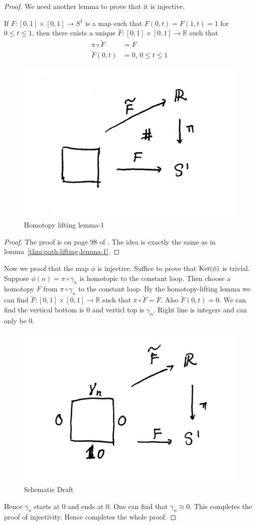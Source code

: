 \begin{proof}
    We need another lemma to prove that it is injective.
    \begin{lemma}
        If $F:[0,1]\times[0,1]\to S^1$ is a map such that
        $F(0,t)=F(1,t)=1$ for $0\leq t\leq 1$, then there exists a
        unique $\widetilde F: [0,1]\times[0,1]\to \mathbb{R}$ such that
        \begin{align}
            \pi\circ \widetilde F &= F \\
            \widetilde F(0,t) &=0,\, 0\leq t\leq 1
        \end{align}
    \end{lemma}
    \begin{figure}[H]
        \centering
        \includegraphics[width=0.5\linewidth]{pics/homotopy-lifting-1.pdf}
        \caption{Homotopy lifting lemma-1}
    \end{figure}
    \begin{proof}
        The proof is on page 98 of \cite{book}. The idea is exactly
        the same as in lemma~\ref{thm:path-lifting-lemma-1}.
    \end{proof}
    Now we proof that the map $\phi$ is injective. Suffice to prove
    that $\operatorname{Ker}(\phi)$ is trivial. Suppose $\phi(n)=\pi\circ \gamma_n$
    is homotopic to the constant loop. Then choose a homotopy $F$
    from $\pi\circ\gamma_n$ to the constant loop. By the
    homotopy-lifting lemma we can find $\widetilde F: [0,1]\times[0,1]\to
    \mathbb{R}$ such that $\pi\circ \widetilde F = F$. Also
    $\widetilde F(0,t)=0$.
    We can find the vertical bottom is $0$ and verticl top is
    $\gamma_n$. Right line is integers and can only be $0$. 
    \begin{figure}[H]
        \centering
        \includegraphics[width=0.6\linewidth]{pics/homotopy-lifting-2.pdf}
        \caption{Schematic Draft}
    \end{figure}
    Hence $\gamma_n$ starts at $0$ and ends at $0$.  One can find that
    $\gamma_n\cong 0$. This completes the proof of injectivity. Hence
    completes the whole proof.
\end{proof}

